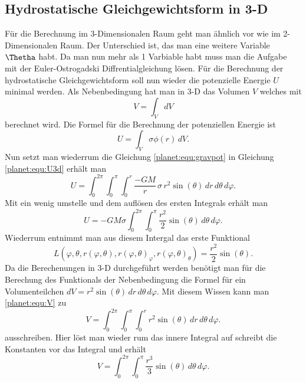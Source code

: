 \subsection{Hydrostatische Gleichgewichtsform in 3-D}
Für die Berechnung im 3-Dimensionalen Raum geht man ähnlich vor wie im 2-Dimensionalen Raum.
Der Unterschied ist, das man eine weitere Variable \(\Thetha\) habt.
Da man nun mehr als 1 Varbiable habt muss man die Aufgabe mit der Euler-Ostrogadski Diffrentialgleichung lösen.
Für die Berechnung der hydrostatische Gleichgewichtsform soll nun wieder die potenzielle Energie \(U\) minimal werden.
Als Nebenbedingung hat man in 3-D das Volumen \(V\) welches mit 
\begin{equation}
	V = \int_{V}^{} dV
	\label{planet:equ:V}
\end{equation}
berechnet wird.
Die Formel für die Berechnung der potenziellen Energie ist
\begin{equation}
	U = \int_{V} \sigma  \phi (r)\, dV.
	\label{planet:equ:U3d}
\end{equation}
Nun setzt man wiederrum die Gleichung \ref{planet:equ:gravpot} in Gleichung \ref{planet:equ:U3d} erhält man
\begin{equation*}
	U = \int_{0}^{2\pi}\int_{0}^{\pi}\int_{0}^{r} \frac{-GM}{r}\, \sigma\, r^2 \sin (\theta) \, dr \, d\theta \, d\varphi.
\end{equation*}
Mit ein wenig umstelle und dem auflösen des ersten Integrals erhält man
\begin{equation*}
	U =-GM\sigma \int_{0}^{2\pi}\int_{0}^{\pi}\frac{r^2}{2}  \sin (\theta) \, d\theta \, d\varphi.
\end{equation*}
Wiederrum entnimmt man aus diesem Intergal das erste Funktional
\begin{equation*}
	L(\varphi,\theta ,r(\varphi,\theta),r(\varphi,\theta)_\varphi,r(\varphi,\theta)_\theta) = \frac{r^2}{2}  \sin (\theta).
\end{equation*}
Da die Berechenungen in 3-D durchgeführt werden benötigt man für die Berechung des Funktionals der Nebenbedingung die Formel für ein Volumenteilchen \(dV = r^2 \sin (\theta) \, dr \, d\theta \, d\varphi \).
Mit diesem Wissen kann man \ref{planet:equ:V} zu
\begin{equation*}
	V = \int_{0}^{2\pi}\int_{0}^{\pi}\int_{0}^{r} r^2 \sin (\theta) \, dr \, d\theta \, d\varphi.
\end{equation*}
ausschreiben.
Hier löst man wieder rum das innere Integral auf schreibt die Konstanten vor das Integral und erhält
\begin{equation*}
	V = \int_{0}^{2\pi}\int_{0}^{\pi}\frac{r^3}{3} \sin (\theta) \, d\theta \, d\varphi.
\end{equation*}
